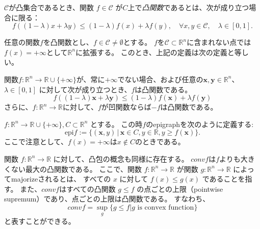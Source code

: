 \begin{dfn}
    $\mathcal{C}$が凸集合であるとき、関数 $f \in \mathcal{C}$ が$C$上で\textit{凸関数}であるとは、次が成り立つ場合に限る：
    \[
        f((1 - \lambda)x + \lambda y) \le (1 - \lambda) f(x) + \lambda f(y), \quad \forall x, y \in \mathcal{C}, \quad \lambda \in [0, 1].
    \] 
\end{dfn}

任意の関数$f$を凸関数とし、$f \in \mathcal{C} \ne \emptyset$とする。
$f$を$\mathcal{C} \subset \mathbb{R}^n$に含まれない点では$f(x) = +\infty$として$\mathbb{R}^n$に拡張する。
このとき、上記の定義は次の定義と等しい。

\begin{dfn}
関数$f: \mathbb{R}^n \to \mathbb{R} \cup \{+ \infty\}$が、常に$+ \infty$でない場合、および任意の$\bm{x}, \bm{y} \in \mathbb{R}^n$、$\lambda \in [0, 1]$ に対して次が成り立つとき、$f$は凸関数である。
\[
f((1 - \lambda)\bm{x} + \lambda \bm{y}) \le (1 - \lambda) f(\bm{x}) + \lambda f(\bm{y})
\]
さらに、$f: \mathbb{R}^n \to \mathbb{R}$に対して、$f$が凹関数ならば$-f$は凸関数である。
\end{dfn}

\begin{dfn}
    $f: \mathbb{R}^n \to \mathbb{R} \cup \{ +\infty\},  C \subset \mathbb{R}^n$ とする。
    この時$f$のepigraphを次のように定義する:
    \[
    \text{epi} f := \{(\bm{x},  y) \, | \, \bm{x} \in C,  y \in \mathbb{R},  y \ge f(\bm{x}) \}.
    \]
    ここで注意として、$f(x) = +\infty$は$x \notin C$のときである。
\end{dfn}


関数 \( f : \mathbb{R}^n \to \mathbb{R} \) に対して、凸包の概念も同様に存在する。
$conv f$は$f$よりも大きくない最大の凸関数である。
ここで、関数 $f: \mathbb{R}^n \to \mathbb{R}$ が関数 $g: \mathbb{R}^n \to \mathbb{R}$ によってmajorizeされるとは、
すべての $x$ に対して $f(x) \leq g(x)$ であることを指す。
また、$conv f$はすべての凸関数 $g \leq f$ の点ごとの上限（pointwise supremum）であり、点ごとの上限は凸関数である。
すなわち、
\[
    conv f = \sup_g \{ g \le f | g \text{ is convex function}\}
\]
と表すことができる。



